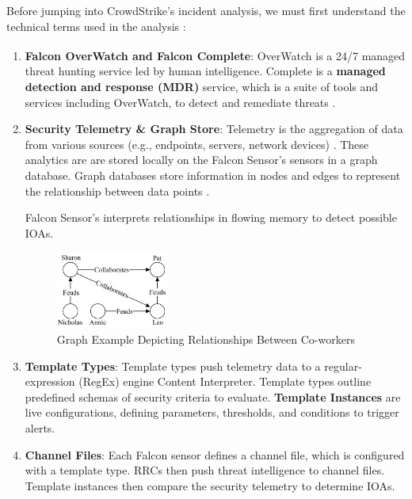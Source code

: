 Before jumping into CrowdStrike's incident analysis, we must first understand the technical terms used in the analysis \cite{crowdstrikechannelfile291rca}:

\begin{enumerate}
    \item \textbf{Falcon OverWatch\textsuperscript{\textregistered} and Falcon Complete\textsuperscript{\texttrademark}}: OverWatch is a 24/7 managed threat hunting service led by human
          intelligence. Complete is a \textbf{managed detection and response (MDR)} service, which is a suite of tools and services including OverWatch, to detect and remediate threats
          \cite{cosive_falcon_complete}\cite{crowdstrike_falcon_complete}\cite{crowdstrike_overwatch}.

    \item \textbf{Security Telemetry \& Graph Store}: Telemetry is the aggregation of data from various sources (e.g., endpoints, servers, network devices) \cite{proofpoint_telemetry}. These analytics are
          are stored locally on the Falcon Sensor's sensors in a graph database. Graph databases store information in nodes and edges to represent
          the relationship between data points \cite{oracle_graph_database}.

          \newpage
          Falcon Sensor's interprets relationships in flowing memory to detect possible IOAs.\\
          \begin{figure}[h!]
              \vspace{-1em}
              \centering
              \includegraphics[width=0.35\textwidth]{Sections/crowd/graph.png}
              \caption{Graph Example Depicting Relationships Between Co-workers}
              \label{fig:graphdb}

              \vspace{-1em}
          \end{figure}

    \item \textbf{Template Types}: Template types push telemetry data to a regular-expression (RegEx) engine
          Content Interpreter. Template types outline predefined schemas of security criteria to evaluate. \textbf{Template Instances}
          are live configurations, defining parameters, thresholds, and conditions to trigger alerts.
    \item \textbf{Channel Files}: Each Falcon sensor defines a channel file, which is configured with a
          template type. RRCs then push threat intelligence to channel files. Template instances then compare the security telemetry to
          determine IOAs.



\end{enumerate}
